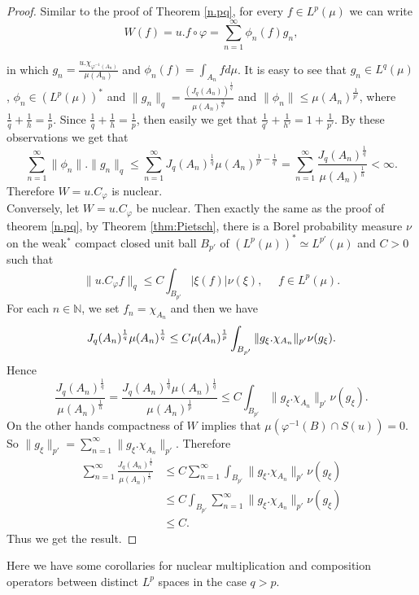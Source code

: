 \documentclass{amsart}
\theoremstyle{definition}\newtheorem{defn}[thm]{Definition}
\theoremstyle{remark}
\numberwithin{equation}{section}
\begin{document}
\begin{proof}
Similar to the proof of Theorem \ref{n.pq}, for every $f\in L^p(\mu)$ we can write
$$W(f)=u.f\circ \varphi=\sum^{\infty}_{n=1}\phi_n(f)g_n,$$

in which $g_n=\frac{u.\chi_{\varphi^{-1}(A_n)}}{\mu(A_n)}$ and $\phi_n(f)=\int_{A_n}fd\mu$. It is easy to see that $g_n\in L^q(\mu)$, $\phi_n\in (L^p(\mu))^*$ and $\|g_n\|_q=\frac{(J_q(A_n))^{\frac{1}{q}}}{\mu(A_n)^{\frac{1}{q'}}}$ and $\|\phi_n\|\leq\mu(A_n)^{\frac{1}{p'}}$, where $\frac{1}{q}+\frac{1}{h}=\frac{1}{p}$. Since $\frac{1}{q}+\frac{1}{h}=\frac{1}{p}$, then easily we get that $\frac{1}{q'}+\frac{1}{h'}=1+\frac{1}{p'}$. By these observations we get that 
$$\sum^{\infty}_{n=1}\|\phi_n\|.\|g_n\|_q\leq \sum^{\infty}_{n=1}J_q(A_n)^{\frac{1}{q}}\mu(A_n)^{\frac{1}{p'}-\frac{1}{q'}}=\sum^{\infty}_{n=1}\frac{J_q(A_n)^{\frac{1}{q}}}{\mu(A_n)^{\frac{1}{h}}}<\infty.$$
Therefore $W=u.C_{\varphi}$ is nuclear.\\
Conversely, let $W=u.C_{\varphi}$ be nuclear. Then exactly the same as the proof of theorem \ref{n.pq}, by Theorem \ref{thm:Pietsch}, there is a Borel probability measure $\nu$ on the weak$^*$ compact closed unit ball $B_{p'}$ of $(L^p(\mu))^*\simeq L^{p'}(\mu)$ and $C>0$ such that
$$\|u.C_{\varphi}f\|_q\leq C \int_{B_{p'}}|\xi(f)|\nu(\xi), \ \ \ \ \ \ f\in L^p(\mu).$$
For each $n\in \mathbb{N}$, we set $f_n=\chi_{A_n}$ and then we have
$$
J_q(A_n)^{\frac{1}{q}}\mu(A_n)^{\frac{1}{q}}\leq C\mu(A_n)^{\frac{1}{p}}\int_{B_{p'}}\|g_{\xi}.\chi_{A_n}\|_{p'}\nu(g_{\xi}).\\
$$
Hence 
$$\frac{J_q(A_n)^{\frac{1}{q}}}{\mu(A_n)^{\frac{1}{h}}}=\frac{J_q(A_n)^{\frac{1}{q}}\mu(A_n)^{\frac{1}{q}}}{\mu(A_n)^{\frac{1}{p}}}\leq C\int_{B_{p'}}\|g_{\xi}.\chi_{A_n}\|_{p'}\nu(g_{\xi}).$$
 On the other hands compactness of $W$ implies that $\mu(\varphi^{-1}(B)\cap S(u))=0$. So $\|g_{\xi}\|_{p'}=\sum^{\infty}_{n=1}\|g_{\xi}.\chi_{A_n}\|_{p'}$. Therefore
\begin{align*}
\sum^{\infty}_{n=1}\frac{J_q(A_n)^{\frac{1}{q}}}{\mu(A_n)^{\frac{1}{h}}}&\leq C\sum^{\infty}_{n=1}\int_{B_{p'}}\|g_{\xi}.\chi_{A_n}\|_{p'}\nu(g_{\xi})\\
&\leq C\int_{B_{p'}}\sum^{\infty}_{n=1}\|g_{\xi}.\chi_{A_n}\|_{p'}\nu(g_{\xi})\\
&\leq C.
\end{align*}
Thus we get the result.
\end{proof}
Here we have some corollaries for nuclear multiplication and composition operators between distinct $L^p$ spaces in the case $q>p$.
\end{document}
